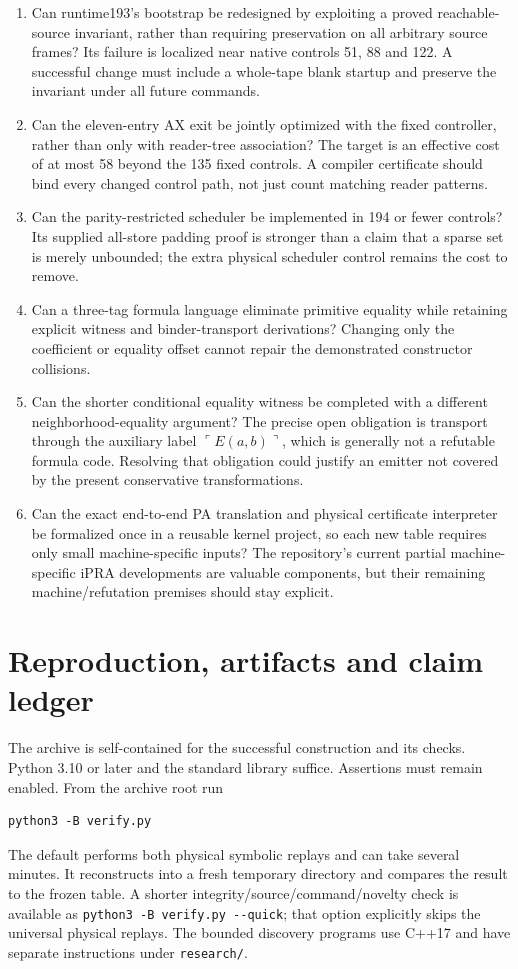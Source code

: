 \documentclass[11pt,letterpaper]{article}
\newcommand{\file}[1]{\texttt{\nolinkurl{#1}}}
\begin{document}
\begin{enumerate}
\item Can runtime193's bootstrap be redesigned by exploiting a proved
reachable-source invariant, rather than requiring preservation on all
arbitrary source frames? Its failure is localized near native controls
51, 88 and 122. A successful change must include a whole-tape blank
startup and preserve the invariant under all future commands.
\item Can the eleven-entry AX exit be jointly optimized with the fixed
controller, rather than only with reader-tree association? The target is
an effective cost of at most 58 beyond the 135 fixed controls. A compiler
certificate should bind every changed control path, not just count matching
reader patterns.
\item Can the parity-restricted scheduler be implemented in 194 or fewer
controls? Its supplied all-store padding proof is stronger than a claim
that a sparse set is merely unbounded; the extra physical scheduler
control remains the cost to remove.
\item Can a three-tag formula language eliminate primitive equality while
retaining explicit witness and binder-transport derivations? Changing only
the coefficient or equality offset cannot repair the demonstrated
constructor collisions.
\item Can the shorter conditional equality witness be completed with a
different neighborhood-equality argument? The precise open obligation is
transport through the auxiliary label $\ulcorner E(a,b)\urcorner$, which
is generally not a refutable formula code. Resolving that obligation could
justify an emitter not covered by the present conservative transformations.
\item Can the exact end-to-end PA translation and physical certificate
interpreter be formalized once in a reusable kernel project, so each new
table requires only small machine-specific inputs? The repository's
current partial machine-specific iPRA developments are valuable components, but their
remaining machine/refutation premises should stay explicit.
\end{enumerate}

\section{Reproduction, artifacts and claim ledger}

The archive is self-contained for the successful construction and its
checks. Python 3.10 or later and the standard library suffice. Assertions
must remain enabled. From the archive root run
\begin{verbatim}
python3 -B verify.py
\end{verbatim}
The default performs both physical symbolic replays and can take several
minutes. It reconstructs into a fresh temporary directory and compares the
result to the frozen table. A shorter integrity/source/command/novelty check
is available as \verb|python3 -B verify.py --quick|; that option explicitly
skips the universal physical replays. The bounded discovery programs use
C++17 and have separate instructions under \file{research/}.
\end{document}
